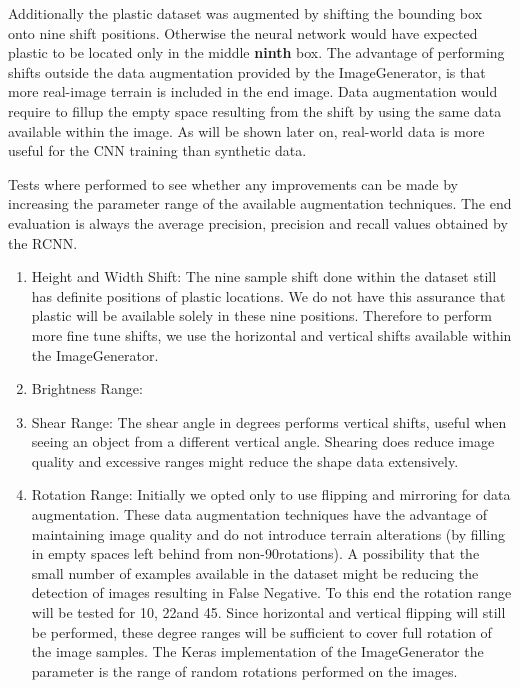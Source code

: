 \documentclass{IEEEtran}
\begin{document}
Additionally the plastic dataset was augmented by shifting the bounding box onto nine shift positions. Otherwise the neural network would have expected plastic to be located only in the middle \textbf{ninth} box. The advantage of performing shifts outside the data augmentation provided by the ImageGenerator, is that more real-image terrain is included in the end image. Data augmentation would require to fillup the empty space resulting from the shift by using the same data available within the image. As will be shown later on, real-world data is more useful for the CNN training than synthetic data.\newline

Tests where performed to see whether any improvements can be made by increasing the parameter range of the available augmentation techniques. The end evaluation is always the average precision, precision and recall values obtained by the RCNN. 

\begin{enumerate}
\item Height and Width Shift: The nine sample shift done within the dataset still has definite positions of plastic locations. We do not have this assurance that plastic will be available solely in these nine positions. Therefore to perform more fine tune shifts, we use the horizontal and vertical shifts available within the ImageGenerator.\newline

\item Brightness Range:

\item Shear Range: The shear angle in degrees performs vertical shifts, useful when seeing an object from a different vertical angle. Shearing does reduce image quality and excessive ranges might reduce the shape data extensively.

\item Rotation Range: Initially we opted only to use flipping and mirroring for data augmentation. These data augmentation techniques have the advantage of maintaining image quality and do not introduce terrain alterations (by filling in empty spaces left behind from non-90\degree rotations). A possibility that the small number of examples available in the dataset might be reducing the detection of images resulting in False Negative. To this end the rotation range will be tested for 10\degree, 22\degree and 45\degree. Since horizontal and vertical flipping will still be performed, these degree ranges will be sufficient to cover full rotation of the image samples. The Keras implementation of the ImageGenerator the parameter is the range of random rotations performed on the images.\newline
\end{enumerate}
\end{document}
